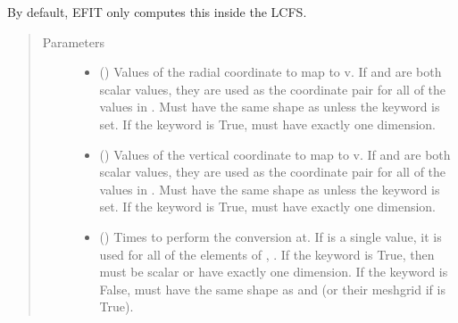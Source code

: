 \documentclass[letterpaper,10pt,english]{sphinxmanual}
\begin{document}
\begin{fulllineitems}
\begin{fulllineitems}
By default, EFIT only computes this inside the LCFS.
\begin{quote}\begin{description}
\item[{Parameters}] \leavevmode\begin{itemize}
\item {} 
 () \textendash{} Values of the radial coordinate to
map to v. If  and  are both scalar values,
they are used as the coordinate pair for all of the values in
. Must have the same shape as  unless the 
keyword is set. If the  keyword is True,  must
have exactly one dimension.

\item {} 
 () \textendash{} Values of the vertical coordinate to
map to v. If  and  are both scalar values,
they are used as the coordinate pair for all of the values in
. Must have the same shape as  unless the 
keyword is set. If the  keyword is True,  must
have exactly one dimension.

\item {} 
 () \textendash{} Times to perform the conversion at.
If  is a single value, it is used for all of the elements of
, . If the  keyword is True, then  must be
scalar or have exactly one dimension. If the  keyword is
False,  must have the same shape as  and  (or their
meshgrid if  is True).

\end{itemize}


\end{description}
\end{quote}
\end{fulllineitems}
\end{fulllineitems}
\end{document}
